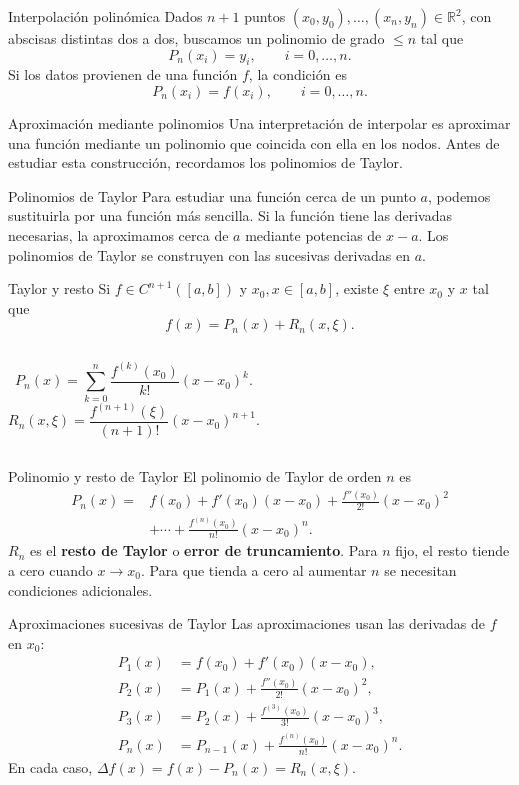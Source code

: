 \documentclass[original_version/main.tex]{subfiles}
\begin{document}
\begin{frame}[t]{Interpolación polinómica}
\small
Dados $n+1$ puntos $(x_0,y_0),\ldots,(x_n,y_n)\in\mathbb{R}^2$, con abscisas distintas dos a dos, buscamos un polinomio de grado $\le n$ tal que
\[P_n(x_i)=y_i,\qquad i=0,\ldots,n.\]
Si los datos provienen de una función $f$, la condición es
\[P_n(x_i)=f(x_i),\qquad i=0,\ldots,n.\]
\end{frame}
\begin{frame}[t]{Aproximación mediante polinomios}
Una interpretación de interpolar es aproximar una función mediante un polinomio que coincida con ella en los nodos.
\bigskip
Antes de estudiar esta construcción, recordamos los polinomios de Taylor.
\end{frame}
\begin{frame}[t]{Polinomios de Taylor}
Para estudiar una función cerca de un punto $a$, podemos sustituirla por una función más sencilla.
\bigskip
Si la función tiene las derivadas necesarias, la aproximamos cerca de $a$ mediante potencias de $x-a$.
\bigskip
Los polinomios de Taylor se construyen con las sucesivas derivadas en $a$.
\end{frame}
\begin{frame}[t]{Taylor y resto}
\small Si $f\in C^{n+1}([a,b])$ y $x_0,x\in[a,b]$, existe $\xi$ entre $x_0$ y $x$ tal que
\[f(x)=P_n(x)+R_n(x,\xi).\]
\begin{columns}
\[P_n(x)=\sum_{k=0}^n\frac{f^{(k)}(x_0)}{k!}(x-x_0)^k.\]
\[R_n(x,\xi)=\frac{f^{(n+1)}(\xi)}{(n+1)!}(x-x_0)^{n+1}.\]
\end{columns}
\end{frame}
\begin{frame}[t]{Polinomio y resto de Taylor}
\small El polinomio de Taylor de orden $n$ es
\begin{align*}
P_n(x)={}&f(x_0)+f'(x_0)(x-x_0)+\frac{f''(x_0)}{2!}(x-x_0)^2\\
&+\cdots+\frac{f^{(n)}(x_0)}{n!}(x-x_0)^n.
\end{align*}
$R_n$ es el \textbf{resto de Taylor} o \textbf{error de truncamiento}.
\medskip
Para $n$ fijo, el resto tiende a cero cuando $x\to x_0$. Para que tienda a cero al aumentar $n$ se necesitan condiciones adicionales.
\end{frame}
\begin{frame}[t]{Aproximaciones sucesivas de Taylor}
\small
Las aproximaciones usan las derivadas de $f$ en $x_0$:
\begin{align*}
P_1(x)&=f(x_0)+f'(x_0)(x-x_0),\\
P_2(x)&=P_1(x)+\frac{f''(x_0)}{2!}(x-x_0)^2,\\
P_3(x)&=P_2(x)+\frac{f^{(3)}(x_0)}{3!}(x-x_0)^3,\\
P_n(x)&=P_{n-1}(x)+\frac{f^{(n)}(x_0)}{n!}(x-x_0)^n.
\end{align*}
En cada caso, $\Delta f(x)=f(x)-P_n(x)=R_n(x,\xi)$.
\end{frame}
\end{document}
